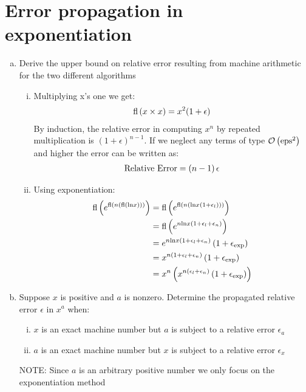 \section{Error propagation in exponentiation}
\begin{enumerate}[(a)]
	\item Derive the upper bound on relative error resulting from machine arithmetic for the two different algorithms
		\begin{enumerate}[(i)]
			\item Multiplying x's one we get:
				\begin{align*}
					\mathrm{fl}\left(x \times x\right) = x^2 (1+\epsilon)
				\end{align*}
				By induction, the relative error in computing $x^n$ by repeated multiplication is $\left(1+\epsilon\right)^{n-1}$. If we neglect any terms of type $\mathcal{O}\left(\mathrm{eps}^2\right)$ and higher the error can be written as:
				\begin{align*}
				\mathrm{Relative \ Error} = \left({n-1}\right)\epsilon
				\end{align*}
			
			\item Using exponentiation:
				\begin{align*}
					\mathrm{fl}\left({e^{\mathrm{fl}\left({n\left({\mathrm{fl}\left({\mathrm{ln}x}\right)}\right)}\right)}}\right)	&= \mathrm{fl}\left({e^{\mathrm{fl}\left({n\left({\mathrm{ln}x\left({1+\epsilon_l}\right)}\right)}\right)}}\right)\\
																			&= \mathrm{fl}\left({e^{n \mathrm{ln}x \left({1+\epsilon_l+\epsilon_n}\right)}}\right)\\
																			&= e^{n \mathrm{ln}x \left({1+\epsilon_l+\epsilon_n}\right)}\left({1+\epsilon_{\mathrm{exp}}}\right)\\
																			&= x^{n\left({1+\epsilon_l+\epsilon_n}\right)}\left({1+\epsilon_{\mathrm{exp}}}\right)\\
																			&= x^n\left({x^{n\left({\epsilon_l+\epsilon_n}\right)}\left({1+\epsilon_{\mathrm{exp}}}\right)}\right)
				\end{align*}
		\end{enumerate}
	\item Suppose $x$ is positive and $a$ is nonzero. Determine the propagated relative error $\epsilon$ in $x^a$ when:
		\begin{enumerate}[(i)]
			\item $x$ is an exact machine number  but $a$ is subject to a relative error $\epsilon_a$
				
			\item $a$ is an exact machine number  but $x$ is subject to a relative error $\epsilon_x$
		\end{enumerate}
		NOTE: Since $a$ is an arbitrary positive number we only focus on the exponentiation method
\end{enumerate}

